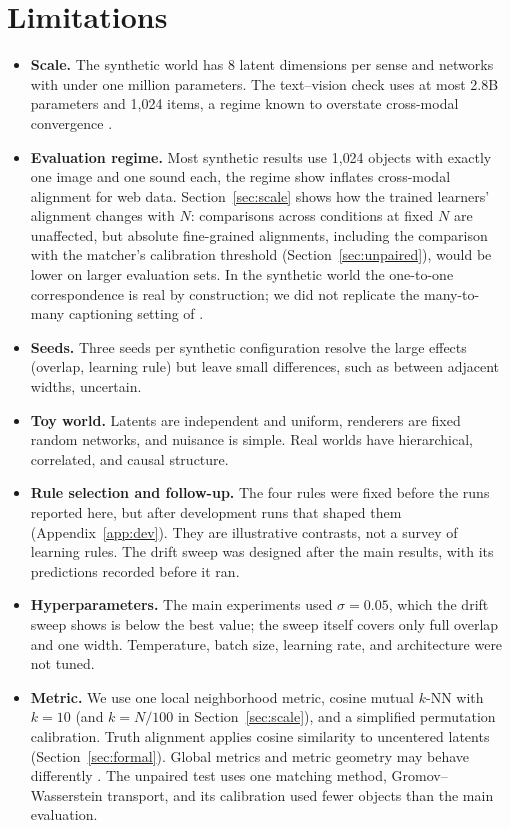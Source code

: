 \documentclass[11pt]{article}
\begin{document}
\section{Limitations}

\begin{itemize}
  \item \textbf{Scale.} The synthetic world has 8 latent dimensions per sense and networks with under one million parameters. The text--vision check uses at most 2.8B parameters and 1{,}024 items, a regime known to overstate cross-modal convergence \citep{koepke2026cave}.
  \item \textbf{Evaluation regime.} Most synthetic results use 1{,}024 objects with exactly one image and one sound each, the regime \citet{koepke2026cave} show inflates cross-modal alignment for web data. Section~\ref{sec:scale} shows how the trained learners' alignment changes with $N$: comparisons across conditions at fixed $N$ are unaffected, but absolute fine-grained alignments, including the comparison with the matcher's calibration threshold (Section~\ref{sec:unpaired}), would be lower on larger evaluation sets. In the synthetic world the one-to-one correspondence is real by construction; we did not replicate the many-to-many captioning setting of \citet{koepke2026cave}.
  \item \textbf{Seeds.} Three seeds per synthetic configuration resolve the large effects (overlap, learning rule) but leave small differences, such as between adjacent widths, uncertain.
  \item \textbf{Toy world.} Latents are independent and uniform, renderers are fixed random networks, and nuisance is simple. Real worlds have hierarchical, correlated, and causal structure.
  \item \textbf{Rule selection and follow-up.} The four rules were fixed before the runs reported here, but after development runs that shaped them (Appendix~\ref{app:dev}). They are illustrative contrasts, not a survey of learning rules. The drift sweep was designed after the main results, with its predictions recorded before it ran.
  \item \textbf{Hyperparameters.} The main experiments used $\sigma=0.05$, which the drift sweep shows is below the best value; the sweep itself covers only full overlap and one width. Temperature, batch size, learning rate, and architecture were not tuned.
  \item \textbf{Metric.} We use one local neighborhood metric, cosine mutual $k$-NN with $k=10$ (and $k=N/100$ in Section~\ref{sec:scale}), and a simplified permutation calibration. Truth alignment applies cosine similarity to uncentered latents (Section~\ref{sec:formal}). Global metrics and metric geometry may behave differently \citep{groger2026aristotelian,you2026structure}. The unpaired test uses one matching method, Gromov--Wasserstein transport, and its calibration used fewer objects than the main evaluation.

\end{itemize}
\end{document}
